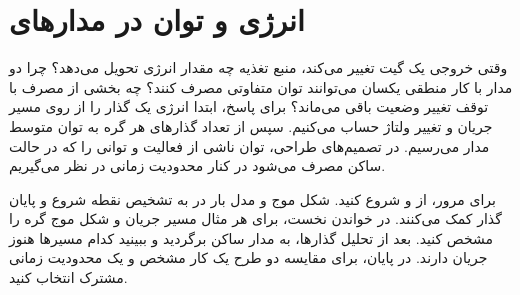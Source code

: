 \chapter{انرژی و توان در مدارهای }
\label{chap:power}

وقتی خروجی یک گیت  تغییر می‌کند، منبع تغذیه چه مقدار
انرژی تحویل می‌دهد؟ چرا دو مدار با کار منطقی یکسان می‌توانند توان
متفاوتی مصرف کنند؟ چه بخشی از مصرف با توقف تغییر وضعیت باقی می‌ماند؟
برای پاسخ، ابتدا انرژی یک گذار را از روی مسیر جریان و تغییر ولتاژ
حساب می‌کنیم. سپس از تعداد گذارهای هر گره به توان متوسط مدار می‌رسیم.
در تصمیم‌های طراحی، توان ناشی از فعالیت و توانی را که در حالت ساکن
مصرف می‌شود در کنار محدودیت زمانی در نظر می‌گیریم.

برای مرور، از 
و  شروع کنید.
شکل موج و مدل بار در 
به تشخیص نقطه شروع و پایان گذار کمک می‌کنند. در خواندن نخست، برای هر
مثال مسیر جریان و شکل موج گره را مشخص کنید. بعد از تحلیل گذارها،
به مدار ساکن برگردید و ببینید کدام مسیرها هنوز جریان دارند. در پایان،
برای مقایسه دو طرح یک کار مشخص و یک محدودیت زمانی مشترک انتخاب کنید.










